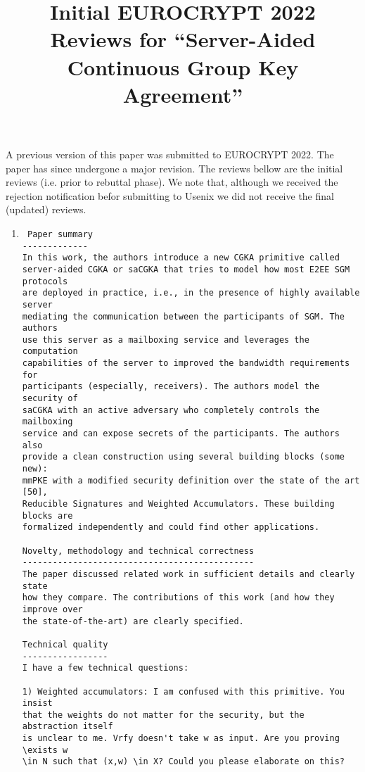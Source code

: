 \documentclass[letterpaper,10pt]{article}
\title{Initial EUROCRYPT 2022 Reviews for ``Server-Aided Continuous Group Key Agreement''}
\author{
} %
\begin{document}
{
	\def\addcontentsline#1#2#3{}
	\maketitle
}

A previous version of this paper was submitted to EUROCRYPT 2022. The paper
has since undergone a major revision. The reviews bellow are the initial
reviews (i.e. prior to rebuttal phase). We note that, although we received
the rejection notification befor submitting to Usenix we did not receive the
final (updated) reviews.
\begin{enumerate}[label=(\Alph*)]
\item \begin{verbatim} Paper summary
-------------
In this work, the authors introduce a new CGKA primitive called
server-aided CGKA or saCGKA that tries to model how most E2EE SGM protocols
are deployed in practice, i.e., in the presence of highly available server
mediating the communication between the participants of SGM. The authors
use this server as a mailboxing service and leverages the computation
capabilities of the server to improved the bandwidth requirements for
participants (especially, receivers). The authors model the security of
saCGKA with an active adversary who completely controls the mailboxing
service and can expose secrets of the participants. The authors also
provide a clean construction using several building blocks (some new):
mmPKE with a modified security definition over the state of the art [50],
Reducible Signatures and Weighted Accumulators. These building blocks are
formalized independently and could find other applications.

Novelty, methodology and technical correctness
----------------------------------------------
The paper discussed related work in sufficient details and clearly state
how they compare. The contributions of this work (and how they improve over
the state-of-the-art) are clearly specified.

Technical quality
-----------------
I have a few technical questions:

1) Weighted accumulators: I am confused with this primitive. You insist
that the weights do not matter for the security, but the abstraction itself
is unclear to me. Vrfy doesn't take w as input. Are you proving \exists w
\in N such that (x,w) \in X? Could you please elaborate on this?


\end{verbatim}
\end{enumerate}
\end{document}
